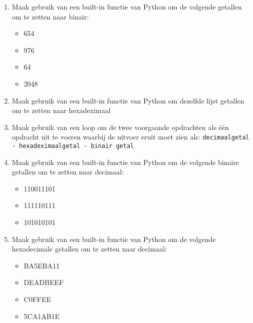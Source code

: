 \begin{enumerate}
\item Maak gebruik van een built-in functie van Python om de volgende getallen om te zetten naar binair:
	\begin{itemize}
	\item 654
	\item 976
	\item 64
	\item 2048
	\end{itemize}
\item Maak gebruik van een built-in functie van Python om dezelfde lijst getallen om te zetten naar hexadeximaal
\item Maak gebruik van een loop om de twee voorgaande opdrachten als \'e\'en opdracht uit te voeren waarbij de uitvoer eruit moet zien als: \texttt{decimaalgetal - hexadeximaalgetal - binair getal}
\item Maak gebruik van een built-in functie van Python om de volgende binaire getallen om te zetten naar decimaal:
	\begin{itemize}
	\item 110011101
	\item 111110111
	\item 101010101
	\end{itemize}
\item Maak gebruik van een built-in functie van Python om de volgende hexadecimale getallen om te zetten naar decimaal:
	\begin{itemize}
	\item BA5EBA11
	\item DEADBEEF
	\item C0FFEE
	\item 5CA1AB1E
	\end{itemize}
\end{enumerate}

